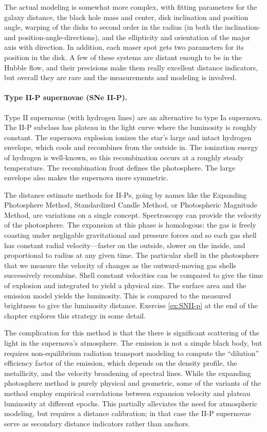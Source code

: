 The actual modeling is somewhat more complex, with fitting parameters for the galaxy distance, the black hole mass and center, disk inclination and position angle, warping of the disks to second order in the radius (in both the inclination- and position-angle-directions), and the ellipticity and orientation of the major axis with direction.  In addition, each maser spot gets two parameters for its position in the disk.  
A few of these systems are distant enough to be in the Hubble flow, and their precisions make them really excellent distance indicators, but overall they are rare and the measurements and modeling is involved.


\paragraph{Type II-P supernovae (SNe II-P).}  Type II supernovae (with hydrogen lines) are an alternative to type Ia supernova.  The II-P subclass has plateau in the light curve where the luminosity is roughly constant.  The supernova explosion ionizes the star's large and intact hydrogen envelope, which cools and recombines from the outside in.  The ionization energy of hydrogen is well-known, so this recombination occurs at a roughly steady temperature.  The recombination front defines the photosphere.  The large envelope also makes the supernova more symmetric.

The distance estimate methods for II-Ps, going by names like the Expanding Photosphere Method,  Standardized Candle Method, or Photospheric Magnitude Method, are variations on a single concept.  Spectroscopy can provide the velocity of the photosphere.  The expansion at this phase is homologous: the gas is freely coasting under negligable gravitational and pressure forces and so each gas shell has constant radial velocity---faster on the outside, slower on the inside, and proportional to radius at any given time.  The particular shell in the photosphere that we measure the velocity of changes as the outward-moving gas shells successively recombine.  Shell constant velocities can be compared to give the time of explosion and integrated to yield a physical size.  The surface area and the emission model yields the luminosity.  This is compared to the measured brightness to give the luminosity distance.  Exercise \ref{ex:SNII-p} at the end of the chapter explores this strategy in some detail.

The complication for this method is that the there is significant scattering of the light in the supernova's atmosphere.  The emission is not a simple black body, but requires non-equilibrium radiation transport modeling to compute the ``dilution'' efficiency factor of the emission, which depends on the density profile, the metallicity, and the velocity broadening of spectral lines.  While the expanding photosphere method is purely physical and geometric, some of the variants of the method employ empirical correlations between expansion velocity and plateau luminosity at different epochs.  This partially alleviates the need for atmospheric modeling, but requires a distance calibration; in that case the II-P supernovae serve as secondary distance indicators rather than anchors.


